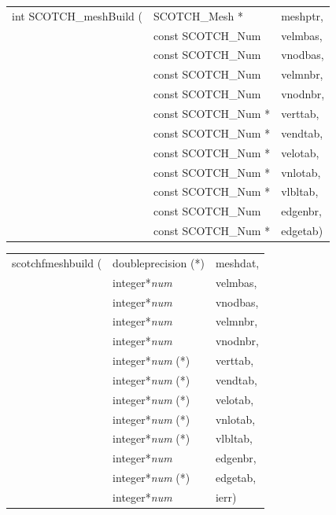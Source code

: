 \begin{itemize}
\progsyn

{\tt\begin{tabular}{l@{}ll}
int SCOTCH\_meshBuild ( & SCOTCH\_Mesh *       & meshptr, \\
                        & const SCOTCH\_Num   & velmbas, \\
                        & const SCOTCH\_Num   & vnodbas, \\
                        & const SCOTCH\_Num   & velmnbr, \\
                        & const SCOTCH\_Num   & vnodnbr, \\
                        & const SCOTCH\_Num * & verttab, \\
                        & const SCOTCH\_Num * & vendtab, \\
                        & const SCOTCH\_Num * & velotab, \\
                        & const SCOTCH\_Num * & vnlotab, \\
                        & const SCOTCH\_Num * & vlbltab, \\
                        & const SCOTCH\_Num   & edgenbr, \\
                        & const SCOTCH\_Num * & edgetab)
\end{tabular}}

{\tt\begin{tabular}{l@{}ll}
scotchfmeshbuild ( & doubleprecision (*)   & meshdat, \\
                   & integer*{\it num}     & velmbas, \\
                   & integer*{\it num}     & vnodbas, \\
                   & integer*{\it num}     & velmnbr, \\
                   & integer*{\it num}     & vnodnbr, \\
                   & integer*{\it num} (*) & verttab, \\
                   & integer*{\it num} (*) & vendtab, \\
                   & integer*{\it num} (*) & velotab, \\
                   & integer*{\it num} (*) & vnlotab, \\
                   & integer*{\it num} (*) & vlbltab, \\
                   & integer*{\it num}     & edgenbr, \\
                   & integer*{\it num} (*) & edgetab, \\
                   & integer*{\it num}     & ierr)
\end{tabular}}


\end{itemize}
